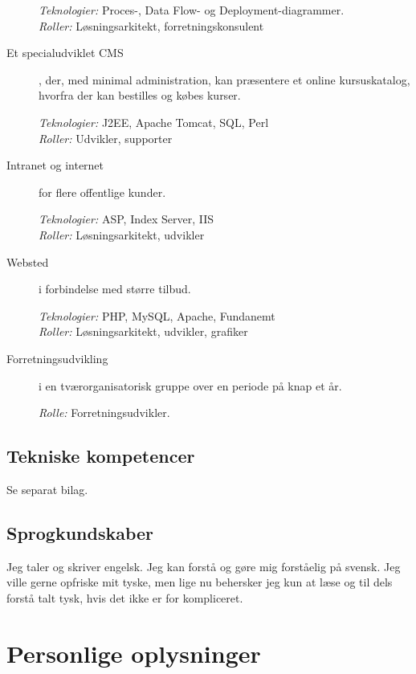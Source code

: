 \documentclass[a4paper,11pt]{article}
\begin{document}
\begin{description}
  \textit{Teknologier:} Proces-, Data Flow- og Deployment-diagrammer.\\
  \textit{Roller:} Løsningsarkitekt, forretningskonsulent

\item[Et specialudviklet CMS], der, med minimal
  administration, kan præsentere et online kursuskatalog,
  hvorfra der kan bestilles og købes kurser.

  \textit{Teknologier:} J2EE, Apache Tomcat, SQL, Perl\\
  \textit{Roller:} Udvikler, supporter

\item[Intranet og internet] for flere offentlige kunder.

  \textit{Teknologier:} ASP, Index Server, IIS\\
  \textit{Roller:} Løsningsarkitekt, udvikler

\item[Websted] i forbindelse med større tilbud.

  \textit{Teknologier:} PHP, MySQL, Apache, Fundanemt\\
  \textit{Roller:} Løsningsarkitekt, udvikler, grafiker

\item[Forretningsudvikling] i en
  tværorganisatorisk gruppe over en periode på knap et
  år.

  \textit{Rolle:} Forretningsudvikler.

\end{description}

\subsection*{Tekniske kompetencer}

Se separat bilag.

\subsection*{Sprogkundskaber}

Jeg taler og skriver engelsk. Jeg kan forstå og gøre mig forståelig på
svensk. Jeg ville gerne opfriske mit tyske, men lige nu behersker jeg
kun at læse og til dels forstå talt tysk, hvis det ikke er for
kompliceret.


\section*{Personlige oplysninger}
\end{document}

